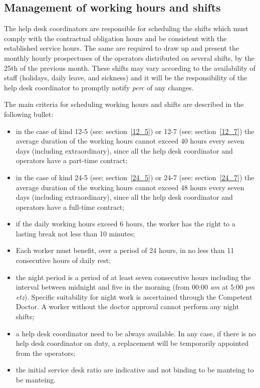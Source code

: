 \subsection{Management of working hours and shifts}
The help desk coordinators are responsible for scheduling the shifts which must comply with the contractual obligation hours and be consistent with the established service hours. The same are required to draw up and present the monthly hourly prospectuses of the operators distributed on several shifts, by the 25th of the previous month. These shifts may vary according to the availability of staff (holidays, daily leave, and sickness) and it will be the responsibility of the help desk coordinator to promptly notify \textit{\gls{perc}} of any changes.

The main criteria for scheduling working hours and shifts are described in the following bullet:
\begin{itemize}
	\item in the case of kind 12{-}5 (see: section~\ref{12_5}) or 12{-}7 (see: section~\ref{12_7}) the average duration of the working hours cannot exceed 40 hours every seven days (including extraordinary), since all the help desk coordinator and operators have a part-time contract;
	\item in the case of kind 24{-}5 (see: section~\ref{24_5}) or 24{-}7 (see: section~\ref{24_7}) the average duration of the working hours cannot exceed 48 hours every seven days (including extraordinary), since all the help desk coordinator and operators have a full-time contract;
	\item if the daily working hours exceed 6 hours, the worker has the right to a lasting break
	not less than 10 minutes;
	\item Each worker must benefit, over a period of 24 hours, in no less than 11 consecutive hours of daily rest;
	\item the night period is a period of at least seven consecutive hours including the interval between midnight and five in the morning (from 00:00 \textit{\gls{am}} at 5:00 \textit{\gls{pm}} \textit{\gls{etz}}). Specific suitability for night work is ascertained through the Competent Doctor. A worker without the doctor approval cannot perform any night shifts;
	\item a help desk coordinator need to be always available. In any case, if there is no help desk coordinator on duty, a replacement will be temporarily appointed from the operators;
	\item the initial service desk ratio are indicative and not binding to be manteing to be manteing.
\end{itemize}